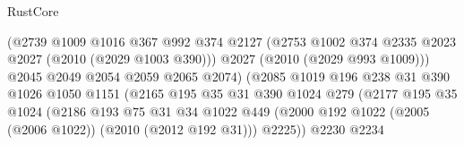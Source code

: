 \begin{lexlean}{RustCore}
\begin{coremodule}
                                    (@2739
                                      @1009
                                      @1016
                                      @367
                                      @992
                                      @374
                                      @2127
                                      (@2753
                                        @1002
                                        @374
                                        @2335
                                        @2023
                                        @2027
                                        (@2010 (@2029 @1003 @390)))
                                      @2027
                                      (@2010 (@2029 @993 @1009)))
                                    @2045
                                    @2049
                                    @2054
                                    @2059
                                    @2065
                                    @2074)
                                  (@2085
                                    @1019
                                    @196
                                    @238
                                    @31
                                    @390
                                    @1026
                                    @1050
                                    @1151
                                    (@2165
                                      @195
                                      @35
                                      @31
                                      @390
                                      @1024
                                      @279
                                      (@2177
                                        @195
                                        @35
                                        @1024
                                        (@2186
                                          @193
                                          @75
                                          @31
                                          @34
                                          @1022
                                          @449
                                          (@2000
                                            @192
                                            @1022
                                            (@2005 (@2006 @1022))
                                            (@2010 (@2012 @192 @31)))
                                          @2225))
                                      @2230
                                      @2234

\end{coremodule}
\end{lexlean}
